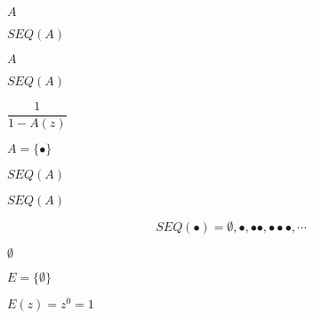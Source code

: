 \documentclass[10pt]{book}
\begin{document}
\begin{mdSnippets}
\begin{mdInlineSnippet}[7fc56270e7a70fa81a5935b72eacbe29]%
$A$\end{mdInlineSnippet}%
\begin{mdInlineSnippet}%
$SEQ(A)$\end{mdInlineSnippet}%
\begin{mdInlineSnippet}[7fc56270e7a70fa81a5935b72eacbe29]%
$A$\end{mdInlineSnippet}%
\begin{mdInlineSnippet}%
$SEQ(A)$\end{mdInlineSnippet}%
\begin{mdInlineSnippet}%
$\dfrac{1}{1 - A(z)}$\end{mdInlineSnippet}%
\begin{mdInlineSnippet}[93ad168a96fddcb95e0e1718301cb64b]%
$A = \{\bullet\}$\end{mdInlineSnippet}%
\begin{mdInlineSnippet}%
$SEQ(A)$\end{mdInlineSnippet}%
\begin{mdInlineSnippet}%
$SEQ(A)$\end{mdInlineSnippet}%
\begin{mdDisplaySnippet}%
\[%
  SEQ(\bullet) = \emptyset,  \bullet,  \bullet\bullet, \bullet\bullet\bullet, \cdots
\]%
\end{mdDisplaySnippet}%
\begin{mdInlineSnippet}[ccf915ca60074c040f63a351cd44e108]%
$\emptyset$\end{mdInlineSnippet}%
\begin{mdInlineSnippet}[19da9d23e701a45d11242b3241e0e2f8]%
$E = \{\emptyset\}$\end{mdInlineSnippet}%
\begin{mdInlineSnippet}%
$E(z) = z^0 = 1$\end{mdInlineSnippet}%
\begin{mdInlineSnippet}[1f11b7ae03fe41651d94de141afcc84a]%

\end{mdInlineSnippet}
\end{mdSnippets}
\end{document}
